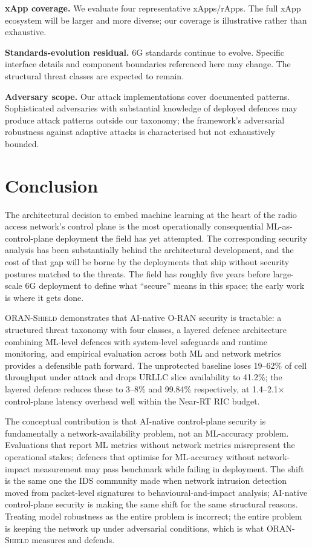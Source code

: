 \documentclass[sigconf,nonacm]{acmart}
\begin{document}
\textbf{xApp coverage.} We evaluate four representative
xApps/rApps. The full xApp ecosystem will be larger and more
diverse; our coverage is illustrative rather than exhaustive.

\textbf{Standards-evolution residual.} 6G standards continue
to evolve. Specific interface details and component boundaries
referenced here may change. The structural threat classes are
expected to remain.

\textbf{Adversary scope.} Our attack implementations cover
documented patterns. Sophisticated adversaries with
substantial knowledge of deployed defences may produce
attack patterns outside our taxonomy; the framework's
adversarial robustness against adaptive attacks is
characterised but not exhaustively bounded.

\section{Conclusion}

The architectural decision to embed machine learning at the
heart of the radio access network's control plane is the most
operationally consequential ML-as-control-plane deployment the
field has yet attempted. The corresponding security analysis
has been substantially behind the architectural development,
and the cost of that gap will be borne by the deployments that
ship without security postures matched to the threats. The
field has roughly five years before large-scale 6G deployment
to define what ``secure'' means in this space; the early work
is where it gets done.

\textsc{ORAN-Shield} demonstrates that AI-native O-RAN security
is tractable: a structured threat taxonomy with four classes,
a layered defence architecture combining ML-level defences with
system-level safeguards and runtime monitoring, and empirical
evaluation across both ML and network metrics provides a
defensible path forward. The unprotected baseline loses
19--62\% of cell throughput under attack and drops URLLC slice
availability to 41.2\%; the layered defence reduces these to
3--8\% and 99.84\% respectively, at 1.4--2.1$\times$ control-plane
latency overhead well within the Near-RT RIC budget.

The conceptual contribution is that AI-native control-plane
security is fundamentally a network-availability problem, not
an ML-accuracy problem. Evaluations that report ML metrics
without network metrics misrepresent the operational stakes;
defences that optimise for ML-accuracy without network-impact
measurement may pass benchmark while failing in deployment.
The shift is the same one the IDS community made when network
intrusion detection moved from packet-level signatures to
behavioural-and-impact analysis; AI-native control-plane
security is making the same shift for the same structural
reasons. Treating model robustness as the entire problem is
incorrect; the entire problem is keeping the network up under
adversarial conditions, which is what \textsc{ORAN-Shield}
measures and defends.
\end{document}
